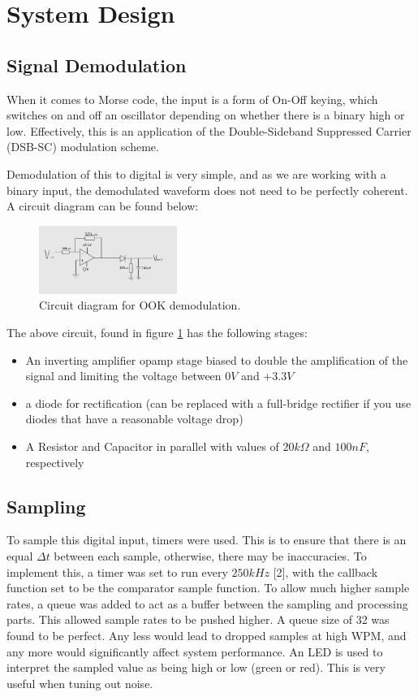 \documentclass[head=13.6pt]{cce2014-design}
\begin{document}
\section{System Design}
\subsection{Signal Demodulation}
When it comes to Morse code, the input is a form of On-Off keying, which switches on and off an oscillator depending on whether there is a binary high or low. Effectively, this is an application of the Double-Sideband Suppressed Carrier (DSB-SC) modulation scheme.

Demodulation of this to digital is very simple, and as we are working with a binary input, the demodulated waveform does not need to be perfectly coherent. A circuit diagram can be found below:

\begin{figure}[tb]
    \centering
    \includegraphics[width=0.4\textwidth]{images/circuit.png}
    \caption{Circuit diagram for OOK demodulation.}
    \label{whateverthehecktherefis}
\end{figure}

The above circuit, found in figure \ref{whateverthehecktherefis} has the following stages:
\begin{itemize}
\item An inverting amplifier opamp stage biased to double the amplification of the signal and limiting the voltage between $0V$ and $+3.3V$
\item a diode for rectification (can be replaced with a full-bridge rectifier if you use diodes that have a reasonable voltage drop)
\item A Resistor and Capacitor in parallel with values of $20k\Omega$ and $100nF$, respectively
\end{itemize}

\subsection{Sampling}
To sample this digital input, timers were used. This is to ensure that there is an equal $\Delta t$ between each sample, otherwise, there may be inaccuracies. To implement this, a timer was set to run every $250kHz$ [2], with the callback function set to be the comparator sample function. To allow much higher sample rates, a queue was added to act as a buffer between the sampling and processing parts. This allowed sample rates to be pushed higher. A queue size of 32 was found to be perfect. Any less would lead to dropped samples at high WPM, and any more would significantly affect system performance. An LED is used to interpret the sampled value as being high or low (green or red). This is very useful when tuning out noise.
\end{document}
